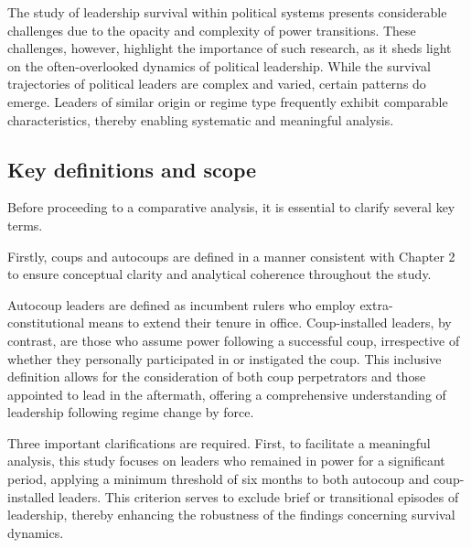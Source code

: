 \documentclass[
  12pt,
]{report}
\begin{document}
The study of leadership survival within political systems presents
considerable challenges due to the opacity and complexity of power
transitions. These challenges, however, highlight the importance of such
research, as it sheds light on the often-overlooked dynamics of
political leadership. While the survival trajectories of political
leaders are complex and varied, certain patterns do emerge. Leaders of
similar origin or regime type frequently exhibit comparable
characteristics, thereby enabling systematic and meaningful analysis.

\subsection{Key definitions and scope}\label{key-definitions-and-scope}

Before proceeding to a comparative analysis, it is essential to clarify
several key terms.

Firstly, coups and autocoups are defined in a manner consistent with
Chapter 2 to ensure conceptual clarity and analytical coherence
throughout the study.

Autocoup leaders are defined as incumbent rulers who employ
extra-constitutional means to extend their tenure in office.
Coup-installed leaders, by contrast, are those who assume power
following a successful coup, irrespective of whether they personally
participated in or instigated the coup. This inclusive definition allows
for the consideration of both coup perpetrators and those appointed to
lead in the aftermath, offering a comprehensive understanding of
leadership following regime change by force.

Three important clarifications are required. First, to facilitate a
meaningful analysis, this study focuses on leaders who remained in power
for a significant period, applying a minimum threshold of six months to
both autocoup and coup-installed leaders. This criterion serves to
exclude brief or transitional episodes of leadership, thereby enhancing
the robustness of the findings concerning survival dynamics.
\end{document}
